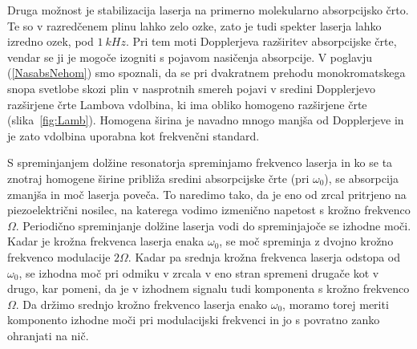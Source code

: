 Druga možnost je stabilizacija laserja na primerno molekularno absorpcijsko
črto. Te so v razredčenem plinu lahko zelo ozke, zato je tudi spekter 
laserja lahko izredno ozek, pod $1~\si{kHz}$. 
Pri tem moti Dopplerjeva razširitev absorpcijske črte, vendar se ji
je mogoče izogniti s pojavom nasičenja 
absorpcije. V poglavju
(\ref{NasabsNehom}) smo spoznali, da se pri dvakratnem prehodu
monokromatskega snopa svetlobe skozi plin v nasprotnih smereh pojavi v
sredini Dopplerjevo razširjene črte Lambova vdolbina, ki 
ima obliko homogeno razširjene črte (slika~\ref{fig:Lamb}). 
Homogena širina je navadno mnogo manjša od Dopplerjeve in
je zato vdolbina uporabna kot frekvenčni standard. 

S spreminjanjem dolžine resonatorja spreminjamo frekvenco laserja in 
ko se ta znotraj homogene širine približa sredini absorpcijske črte (pri $\omega_0$), 
se absorpcija zmanjša in moč laserja poveča. To naredimo tako, da je 
eno od zrcal pritrjeno na piezoelektrični nosilec, na katerega vodimo
izmenično napetost s krožno frekvenco $\Omega$. Periodično spreminjanje dolžine
laserja vodi do spreminjajoče se izhodne moči. Kadar je krožna frekvenca laserja 
enaka $\omega_0$, se moč spreminja z dvojno krožno frekvenco modulacije $2\Omega$. 
Kadar pa srednja krožna frekvenca laserja odstopa od $\omega_0$, se izhodna moč 
pri odmiku v zrcala v eno stran spremeni drugače kot v drugo, kar pomeni, 
da je v izhodnem signalu tudi komponenta s krožno frekvenco $\Omega$. Da držimo 
srednjo krožno frekvenco laserja enako $\omega_0$, moramo torej meriti komponento 
izhodne moči pri modulacijski frekvenci in jo s povratno zanko ohranjati na nič.

